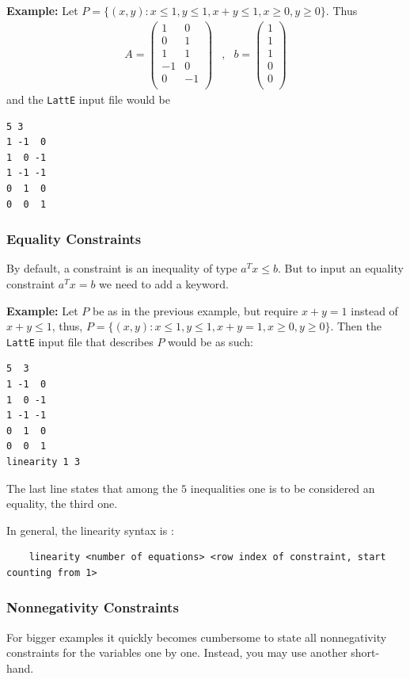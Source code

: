 \documentclass{article}
\newcommand{\example}{{\bf Example:\space}}
\begin{document}
\example
Let $P=\{(x,y): x\leq 1, y\leq 1, x+y\leq 1, x\geq 0, y\geq 0\}$.
Thus
\[
\begin{array}{ccc}
A=\left(
\begin{array}{rr} 
 1 &  0 \\ 
 0 &  1 \\ 
 1 &  1 \\
-1 &  0 \\ 
 0 & -1 \\ 
\end{array} 
\right) 
& , &
b = \left( 
\begin{array}{r} 
1 \\ 
1 \\ 
1 \\ 
0 \\
0 \\ 
\end{array} 
\right)
\end{array}
\]
and the {\tt LattE} input file would be
\begin{verbatim}
5 3
1 -1  0
1  0 -1
1 -1 -1
0  1  0
0  0  1
\end{verbatim}

\subsubsection{Equality Constraints}

By default, a constraint is an inequality of type $a^Tx\leq b$. But to input an equality constraint $a^Tx=b$ we need to add a keyword.

\example
Let $P$ be as in the previous example, but require $x+y=1$ instead of
$x+y\leq 1$, thus, 
$P=\{(x,y): x\leq 1, y\leq 1, x+y=1, x\geq 0, y\geq 0\}$.
Then the {\tt LattE} input file that describes $P$ would be as such:
\begin{verbatim}
5  3
1 -1  0
1  0 -1
1 -1 -1
0  1  0
0  0  1
linearity 1 3
\end{verbatim}
The last line states that among the $5$ inequalities one is to be
considered an equality, the third one.

In general, the linearity syntax is :
\begin{verbatim}
	linearity <number of equations> <row index of constraint, start counting from 1>
\end{verbatim}

\subsubsection{Nonnegativity Constraints}
For bigger examples it quickly becomes cumbersome to state all
nonnegativity constraints for the variables one by one. Instead, you
may use another short-hand.
\end{document}
